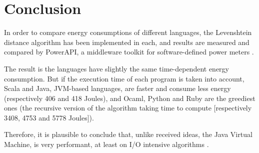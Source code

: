 \chapter*{Conclusion}
\label{ch:Conclusion}
	\thispagestyle{conclusion}
	
	In order to compare energy consumptions of different languages, the Levenshtein distance algorithm has been implemented in each, and results are measured and compared by PowerAPI, a middleware toolkit for software-defined power meters \cite{powerapi-website}.
	
	The result is the languages have slightly the same time-dependent energy consumption. But if the execution time of each program is taken into account, Scala and Java, JVM-based languages, are faster and consume less energy (respectively 406 and 418 Joules), and Ocaml, Python and Ruby are the greediest ones (the recursive version of the algorithm taking time to compute [respectively 3408, 4753 and 5778 Joules]).
	
	Therefore, it is plausible to conclude that, unlike received ideas, the Java Virtual Machine, is very performant, at least on I/O intensive algorithms \cite{poorjvm}.
	